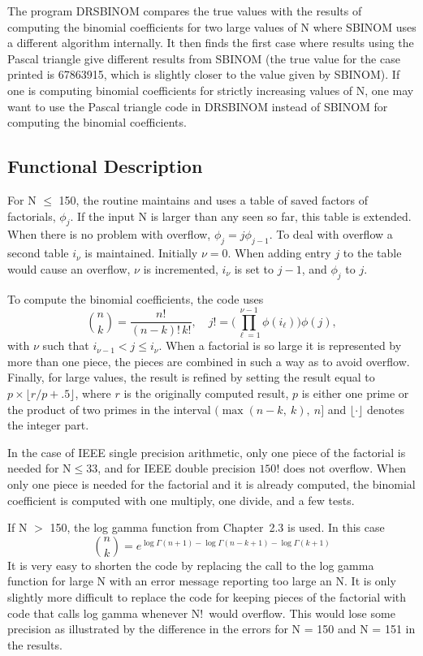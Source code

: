 \documentclass[twoside]{MATH77}
\begin{document}
The program DRSBINOM compares the true values with the results of
computing the binomial coefficients for two large values of N where SBINOM
uses a different algorithm internally.  It then finds the first case where
results using the Pascal triangle give different results from SBINOM (the
true value for the case printed is 67863915, which is slightly closer to
the value given by SBINOM).  If one is computing binomial coefficients for
strictly increasing values of N, one may want to use the Pascal triangle
code in DRSBINOM instead of SBINOM for computing the binomial
coefficients.

\subsection{Functional Description}

For N $\leq$ 150, the routine maintains and uses a table of saved
factors of factorials, $\phi_j$.  If the input N is larger than any
seen so far, this table is extended.  When there is no problem with
overflow, $\phi_j = j \phi_{j-1}$.  To deal with overflow a second
table $i_\nu$ is maintained.  Initially $\nu=0$.  When adding entry
$j$ to the table would cause an overflow, $\nu$ is incremented,
$i_\nu$ is set to $j-1$, and $\phi_j$ to $j$.

To compute the binomial coefficients, the code uses
\begin{equation*}
\binom{n}{k} = \frac{n!}{(n-k)!\,k!}, \quad
j!  = \Big (\prod_{\ell = 1}^{\nu-1} \phi(i_{\ell}) \Big ) \phi (j),
\end{equation*}
with $\nu $ such that $ i_{\nu-1} < j \leq i_\nu$.  When a factorial is so
large it is represented by more than one piece, the pieces are combined in
such a way as to avoid overflow.  Finally, for large values, the result is
refined by setting the result equal to $p \times \lfloor r / p + .5
\rfloor $, where $r$ is the originally computed result, $p$ is either one
prime or the product of two primes in the interval $\big (\max(n-k,\ k),\
n \big ]$ and $ \lfloor \cdot \rfloor$ denotes the integer part.

In the case of IEEE single precision arithmetic, only one piece of the
factorial is needed for $\text{N} \leq 33$, and for IEEE double precision
$150!$ does not overflow.  When only one piece is needed for the factorial
and it is already computed, the binomial coefficient is computed with one
multiply, one divide, and a few tests.


If N $>$ 150, the log gamma function from Chapter~2.3 is used.  In this
case
\begin{equation*}
\binom{n}{k} = e^{\log \Gamma (n+1) - \log \Gamma (n-k+1) -
\log \Gamma (k+1)}
\end{equation*}
It is very easy to shorten the code by replacing the call to the log
gamma function for large N with an error message reporting too large an N.
It is only slightly more difficult to replace the code for keeping pieces
of the factorial with code that calls log gamma whenever N!\ would
overflow.  This would lose some precision as illustrated by the difference
in the errors for N = 150 and N = 151 in the results.
\end{document}
